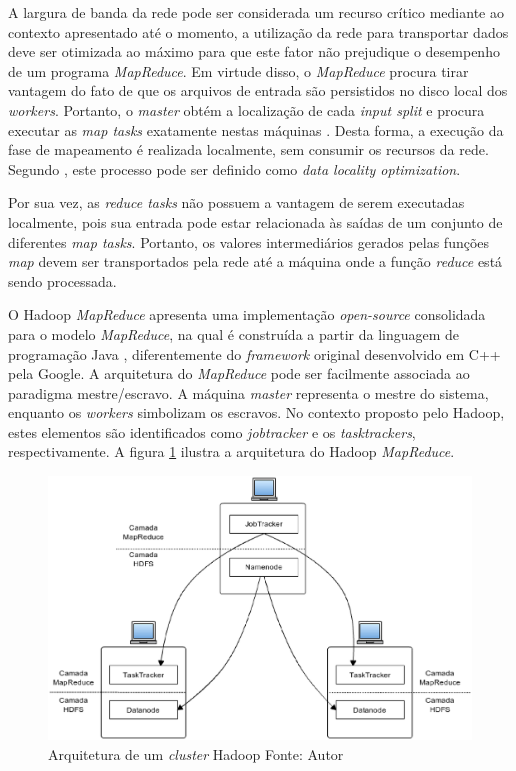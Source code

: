 A largura de banda da rede pode ser considerada um recurso crítico mediante ao contexto apresentado até o momento, a utilização da rede para transportar dados deve ser otimizada ao máximo para que este fator não prejudique o desempenho de um programa \textit{MapReduce}. Em virtude disso, o \textit{MapReduce} procura tirar vantagem do fato de que os arquivos de entrada são persistidos no disco local dos \textit{workers}. Portanto, o \textit{master} obtém a localização de cada \textit{input split} e procura executar as \textit{map tasks} exatamente nestas máquinas \cite{ghemawatMapreduce2008}. Desta forma, a execução da fase de mapeamento é realizada localmente, sem consumir os recursos da rede. Segundo , este processo pode ser definido como \textit{data locality optimization}.

Por sua vez, as \textit{reduce tasks} não possuem a vantagem de serem executadas localmente, pois sua entrada pode estar relacionada às saídas de um conjunto de diferentes \textit{map tasks}. Portanto, os valores intermediários gerados pelas funções \textit{map} devem ser transportados pela rede até a máquina onde a função \textit{reduce} está sendo processada.

O Hadoop \textit{MapReduce} apresenta uma implementação \textit{open-source} consolidada para o modelo \textit{MapReduce}, na qual é construída a partir da linguagem de programação Java \cite{hadoopSiteMapReduce}, diferentemente do \textit{framework} original desenvolvido em C++ pela Google. A arquitetura do \textit{MapReduce} pode ser facilmente associada ao paradigma mestre/escravo. A máquina \textit{master} representa o mestre do sistema, enquanto os \textit{workers} simbolizam os escravos. No contexto proposto pelo Hadoop, estes elementos são identificados como \textit{jobtracker} e os \textit{tasktrackers}, respectivamente. A figura \ref{fig-mapreduce-arquitetura} ilustra a arquitetura do Hadoop \textit{MapReduce}.

\begin{figure}[ht!]
	\centering
	\includegraphics[keepaspectratio=true,scale=0.6]
	  {figuras/mapreduce-arquitetura.eps}
	\caption[Arquitetura de um \textit{cluster} Hadoop]{Arquitetura de um \textit{cluster} Hadoop
	\protect\linebreak Fonte: Autor}
	\label{fig-mapreduce-arquitetura}
\end{figure}
\FloatBarrier

